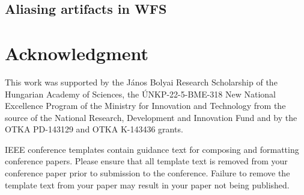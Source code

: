 \documentclass[conference]{IEEEtran}
\begin{document}
\subsection{Aliasing artifacts in WFS}

\section*{Acknowledgment}

This work was supported by the János Bolyai Research Scholarship of the Hungarian Academy of Sciences, the ÚNKP-22-5-BME-318 New National Excellence Program of the Ministry for Innovation and Technology from the source of the National Research, Development and Innovation Fund
and by the OTKA PD-143129 and OTKA K-143436 grants.



\vspace{12pt}
\color{red}
IEEE conference templates contain guidance text for composing and formatting conference papers. Please ensure that all template text is removed from your conference paper prior to submission to the conference. Failure to remove the template text from your paper may result in your paper not being published.
\end{document}
